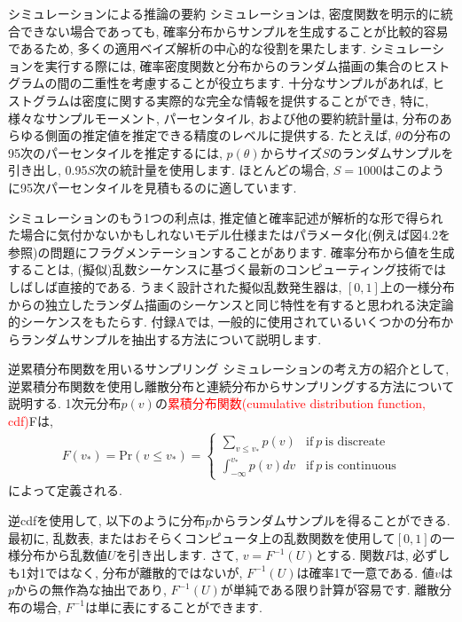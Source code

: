\documentclass[10pt,dvipdfmx,a4]{beamer}
\newcommand{\eqn}[1]{\begin{align*}#1\end{align*}}
\newcommand{\tcr}[1]{\textcolor{red}{#1}}
\begin{document}
\begin{frame}{シミュレーションによる推論の要約}
シミュレーションは, 密度関数を明示的に統合できない場合であっても, 確率分布からサンプルを生成することが比較的容易であるため, 多くの適用ベイズ解析の中心的な役割を果たします.
シミュレーションを実行する際には, 確率密度関数と分布からのランダム描画の集合のヒストグラムの間の二重性を考慮することが役立ちます.
十分なサンプルがあれば, ヒストグラムは密度に関する実際的な完全な情報を提供することができ, 特に, 様々なサンプルモーメント, パーセンタイル, および他の要約統計量は, 
分布のあらゆる側面の推定値を推定できる精度のレベルに提供する.
たとえば, $\theta$の分布の95次のパーセンタイルを推定するには, $p(\theta)$からサイズ$S$のランダムサンプルを引き出し, 0.95$S$次の統計量を使用します.
ほとんどの場合, $S=1000$はこのように95次パーセンタイルを見積もるのに適しています.
\end{frame}


\begin{frame}
シミュレーションのもう1つの利点は, 推定値と確率記述が解析的な形で得られた場合に気付かないかもしれないモデル仕様またはパラメータ化(例えば図4.2を参照)の問題にフラグメンテーションすることがあります.
確率分布から値を生成することは, (擬似)乱数シーケンスに基づく最新のコンピューティング技術ではしばしば直接的である.
うまく設計された擬似乱数発生器は, $[0,1]$上の一様分布からの独立したランダム描画のシーケンスと同じ特性を有すると思われる決定論的シーケンスをもたらす.
付録Aでは, 一般的に使用されているいくつかの分布からランダムサンプルを抽出する方法について説明します.
\end{frame}


\begin{frame}{逆累積分布関数を用いるサンプリング}
シミュレーションの考え方の紹介として, 逆累積分布関数を使用し離散分布と連続分布からサンプリングする方法について説明する.
1次元分布$p(v)$の\tcr{累積分布関数(cumulative distribution function, cdf)}Fは,
\eqn{F(v_*)=\text{Pr}(v\leq v_*)
=\begin{cases}
\sum_{v\leq v_*} p(v) &\text{if}\ p\ \text{is discreate}\\
\int_{-\infty}^{v_*} p(v)dv &\text{if}\ p\ \text{is continuous}
\end{cases}}
によって定義される.

逆cdfを使用して, 以下のように分布$p$からランダムサンプルを得ることができる.
最初に, 乱数表, またはおそらくコンピュータ上の乱数関数を使用して$[0,1]$の一様分布から乱数値$U$を引き出します.
さて, $v=F^{-1}(U)$とする.
関数$F$は, 必ずしも1対1ではなく, 分布が離散的ではないが, $F^{-1}(U)$は確率1で一意である.
値$v$は$p$からの無作為な抽出であり, $F^{-1}(U)$が単純である限り計算が容易です.
離散分布の場合, $F^{-1}$は単に表にすることができます.
\end{frame}
\end{document}
